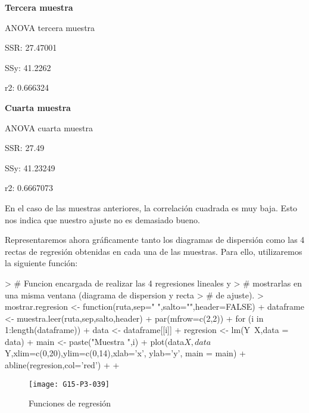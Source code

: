 \documentclass [a4paper] {article}
\begin{document}
\textbf{Tercera muestra}
\begin{Schunk}
\begin{Soutput}
ANOVA tercera muestra
\end{Soutput}
\begin{Soutput}
SSR:  27.47001
\end{Soutput}
\begin{Soutput}
SSy:  41.2262
\end{Soutput}
\begin{Soutput}
r2:  0.666324
\end{Soutput}
\end{Schunk}

\textbf{Cuarta muestra}
\begin{Schunk}
\begin{Soutput}
ANOVA cuarta muestra
\end{Soutput}
\begin{Soutput}
SSR:  27.49
\end{Soutput}
\begin{Soutput}
SSy:  41.23249
\end{Soutput}
\begin{Soutput}
r2:  0.6667073
\end{Soutput}
\end{Schunk}

En el caso de las muestras anteriores, la correlación cuadrada es muy baja. Esto nos indica que nuestro
ajuste no es demasiado bueno.

Representaremos ahora gráficamente tanto los diagramas de dispersión como las 4 rectas de regresión obtenidas
en cada una de las muestras. Para ello, utilizaremos la siguiente función:

\begin{Schunk}
\begin{Sinput}
> # Funcion encargada de realizar las 4 regresiones lineales y
> # mostrarlas en una misma ventana (diagrama de dispersion y recta
> # de ajuste).
> mostrar.regresion <- function(ruta,sep=" ",salto="",header=FALSE){
+   dataframe <- muestra.leer(ruta,sep,salto,header)
+   par(mfrow=c(2,2))
+   for (i in 1:length(dataframe)){
+     data <- dataframe[[i]]
+     regresion <- lm(Y~X,data = data)
+     main <- paste("Muestra ",i)
+     plot(data$X,data$Y,xlim=c(0,20),ylim=c(0,14),xlab='x', ylab='y', main = main)
+     abline(regresion,col='red')
+   }
+ }
\end{Sinput}
\end{Schunk}
\newpage
\begin{figure}[h!]
\centering
\texttt{[image: G15-P3-039]}
\caption{Funciones de regresión}
\end{figure}
\end{document}
